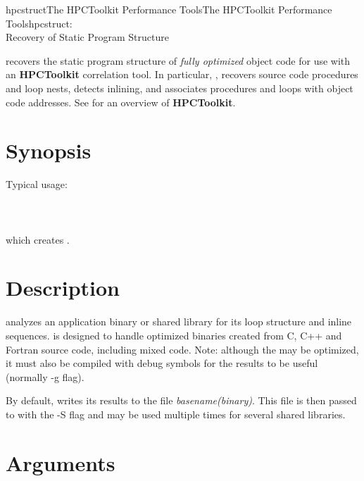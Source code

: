 \documentclass[english]{article}
\begin{document}
\begin{Name}{1}{hpcstruct}{The HPCToolkit Performance Tools}{The HPCToolkit Performance Tools}{hpcstruct:\\ Recovery of Static Program Structure}

 recovers the static program structure of \emph{fully optimized} object code for use with an \textbf{HPCToolkit} correlation tool.
In particular, , recovers source code procedures and loop nests, detects inlining, and associates procedures and loops with object code addresses.
See  for an overview of \textbf{HPCToolkit}.

\end{Name}

\section{Synopsis}

  

Typical usage:\\ \\
\SP\SP\SP{}  \\ \\
which creates .

\section{Description}

 analyzes an application binary or shared library for
its loop structure and inline sequences.
 is designed to handle optimized binaries created from
C, C++ and Fortran source code, including mixed code.
Note: although the  may be optimized, it must also be
compiled with debug symbols for the results to be useful (normally -g
flag).

By default,  writes its results to the file
\emph{basename(binary)}.
This file is then passed to  with the -S flag and may be
used multiple times for several shared libraries.

\section{Arguments}
\end{document}
